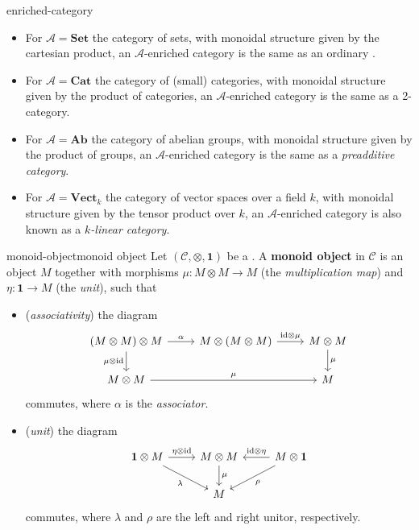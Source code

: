 \begin{example}{enriched-category}
    \begin{itemize}
        \item For $\mathcal{A} = \textbf{Set}$ the category of sets, with monoidal structure given by the cartesian product, an $\mathcal{A}$-enriched category is the same as an ordinary .
        \item For $\mathcal{A} = \textbf{Cat}$ the category of (small) categories, with monoidal structure given by the product of categories, an $\mathcal{A}$-enriched category is the same as a 2-category.
        \item For $\mathcal{A} = \textbf{Ab}$ the category of abelian groups, with monoidal structure given by the product of groups, an $\mathcal{A}$-enriched category is the same as a \textit{preadditive category}.
        \item For $\mathcal{A} = \textbf{Vect}_k$ the category of vector spaces over a field $k$, with monoidal structure given by the tensor product over $k$, an $\mathcal{A}$-enriched category is also known as a \textit{$k$-linear category}.
    \end{itemize}
\end{example}

\begin{topic}{monoid-object}{monoid object}
    Let $(\mathcal{C}, \otimes, \textbf{1})$ be a . A \textbf{monoid object} in $\mathcal{C}$ is an object $M$ together with morphisms $\mu : M \otimes M \to M$ (the \textit{multiplication map}) and $\eta : \textbf{1} \to M$ (the \textit{unit}), such that
    \begin{itemize}
        \item (\textit{associativity}) the diagram
        \[ \begin{tikzcd} (M \otimes M) \otimes M \arrow[swap]{d}{\mu \otimes \id} \arrow{r}{\alpha} & M \otimes (M \otimes M) \arrow{r}{\id \otimes \mu} & M \otimes M \arrow{d}{\mu} \\ M \otimes M \arrow{rr}{\mu} && M \end{tikzcd} \]
        commutes, where $\alpha$ is the \textit{associator}.
        \item (\textit{unit}) the diagram
        \[ \begin{tikzcd} \textbf{1} \otimes M \arrow{r}{\eta \otimes \id} \arrow[swap]{rd}{\lambda} & M \otimes M \arrow{d}{\mu} & M \otimes \textbf{1} \arrow[swap]{l}{\id \otimes \eta} \arrow{dl}{\rho} \\ & M & \end{tikzcd} \]
        commutes, where $\lambda$ and $\rho$ are the left and right unitor, respectively.
    \end{itemize}
\end{topic}

